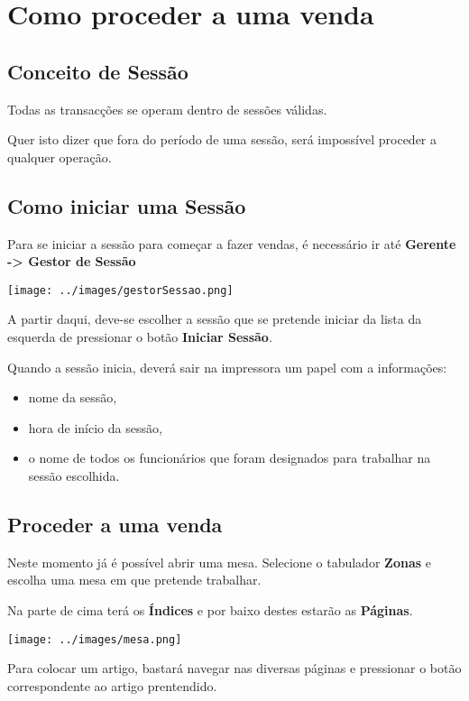 \section{Como proceder a uma venda}


\subsection{Conceito de Sessão}

Todas as transacções se operam dentro de sessões válidas.

Quer isto dizer que fora do período de uma sessão, será impossível proceder a qualquer operação.

\subsection{Como iniciar uma Sessão}

Para se iniciar a sessão para começar a fazer vendas, é necessário ir até \textbf{Gerente -> Gestor de Sessão}

\texttt{[image: ../images/gestorSessao.png]}

A partir daqui, deve-se escolher a sessão que se pretende iniciar da lista da esquerda de pressionar o botão \textbf{Iniciar Sessão}.

Quando a sessão inicia, deverá sair na impressora um papel com a informações:
\begin{itemize}
	\item nome da sessão,
	\item hora de início da sessão, 
	\item o nome de todos os funcionários que foram designados para trabalhar na sessão escolhida.
\end{itemize}

\subsection{Proceder a uma venda}

Neste momento já é possível abrir uma mesa. Selecione o tabulador \textbf{Zonas} e escolha uma mesa em que pretende trabalhar.

Na parte de cima terá os \textbf{Índices} e por baixo destes estarão as \textbf{Páginas}.

\texttt{[image: ../images/mesa.png]}

Para colocar um artigo, bastará navegar nas diversas páginas e pressionar o botão correspondente ao artigo prentendido.

